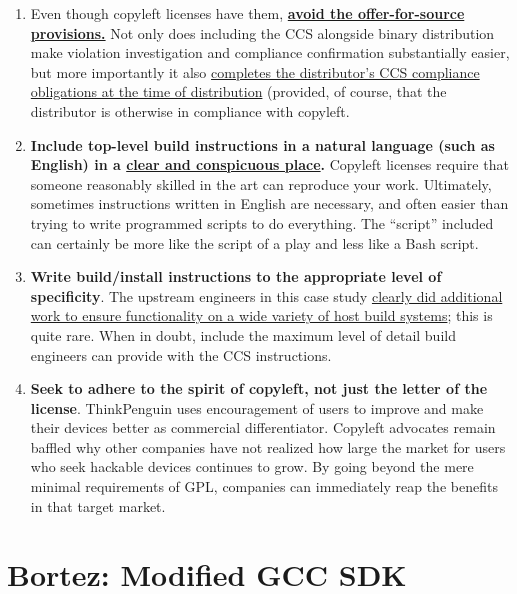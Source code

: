 \begin{enumerate}

\item Even though copyleft licenses have them,
  \hyperref[thinkpenguin-included-ccs]{\bf avoid the offer-for-source
    provisions.}  Not only does including the CCS alongside binary
  distribution make violation investigation and compliance confirmation
  substantially easier, but more importantly it also
  \hyperref[offer-for-source]{completes the distributor's CCS compliance
    obligations at the time of distribution} (provided, of course, that the
  distributor is otherwise in compliance with copyleft.
  
\item {\bf Include top-level build instructions in a natural language (such
  as English) in a \hyperref[thinkpenguin-toplevel-readme]{clear and
    conspicuous place}.}  Copyleft licenses require that someone reasonably
  skilled in the art can reproduce your work.  Ultimately, sometimes
  instructions written in English are necessary, and often easier than trying
  to write programmed scripts to do everything.  The ``script'' included can
  certainly be more like the script of a play and less like a Bash script.

\item {\bf Write build/install instructions to the appropriate level of
  specificity}.  The upstream engineers
  in this case study \hyperref[thinkpenguin-specific-host-system]{clearly did
    additional work to ensure functionality on a wide variety of host build
    systems}; this is quite rare.  When in doubt, include the maximum level
  of detail build engineers can provide with the CCS instructions.

\item {\bf Seek to adhere to the spirit of copyleft, not just the letter of
  the license}.  ThinkPenguin uses encouragement of  users to improve and
  make their devices better as commercial differentiator.  Copyleft advocates
  remain baffled why other companies have not realized how large the market for
  users who seek hackable devices continues to grow.  By going beyond the
  mere minimal requirements of GPL, companies can immediately reap the
  benefits in that target market.
  
\end{enumerate}

\chapter{Bortez: Modified GCC SDK}


